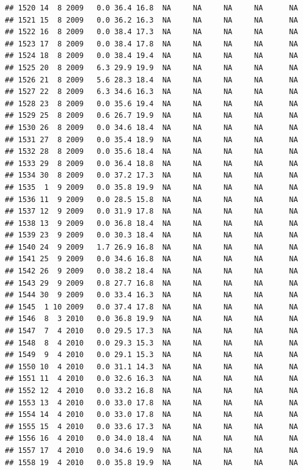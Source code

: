 \documentclass[
]{book}
\begin{document}
\begin{verbatim}
## 1520 14  8 2009   0.0 36.4 16.8  NA     NA     NA     NA      NA
## 1521 15  8 2009   0.0 36.2 16.3  NA     NA     NA     NA      NA
## 1522 16  8 2009   0.0 38.4 17.3  NA     NA     NA     NA      NA
## 1523 17  8 2009   0.0 38.4 17.8  NA     NA     NA     NA      NA
## 1524 18  8 2009   0.0 38.4 19.4  NA     NA     NA     NA      NA
## 1525 20  8 2009   6.3 29.9 19.9  NA     NA     NA     NA      NA
## 1526 21  8 2009   5.6 28.3 18.4  NA     NA     NA     NA      NA
## 1527 22  8 2009   6.3 34.6 16.3  NA     NA     NA     NA      NA
## 1528 23  8 2009   0.0 35.6 19.4  NA     NA     NA     NA      NA
## 1529 25  8 2009   0.6 26.7 19.9  NA     NA     NA     NA      NA
## 1530 26  8 2009   0.0 34.6 18.4  NA     NA     NA     NA      NA
## 1531 27  8 2009   0.0 35.4 18.9  NA     NA     NA     NA      NA
## 1532 28  8 2009   0.0 35.6 18.4  NA     NA     NA     NA      NA
## 1533 29  8 2009   0.0 36.4 18.8  NA     NA     NA     NA      NA
## 1534 30  8 2009   0.0 37.2 17.3  NA     NA     NA     NA      NA
## 1535  1  9 2009   0.0 35.8 19.9  NA     NA     NA     NA      NA
## 1536 11  9 2009   0.0 28.5 15.8  NA     NA     NA     NA      NA
## 1537 12  9 2009   0.0 31.9 17.8  NA     NA     NA     NA      NA
## 1538 13  9 2009   0.0 36.8 18.4  NA     NA     NA     NA      NA
## 1539 23  9 2009   0.0 30.3 18.4  NA     NA     NA     NA      NA
## 1540 24  9 2009   1.7 26.9 16.8  NA     NA     NA     NA      NA
## 1541 25  9 2009   0.0 34.6 16.8  NA     NA     NA     NA      NA
## 1542 26  9 2009   0.0 38.2 18.4  NA     NA     NA     NA      NA
## 1543 29  9 2009   0.8 27.7 16.8  NA     NA     NA     NA      NA
## 1544 30  9 2009   0.0 33.4 16.3  NA     NA     NA     NA      NA
## 1545  1 10 2009   0.0 37.4 17.8  NA     NA     NA     NA      NA
## 1546  8  3 2010   0.0 36.8 19.9  NA     NA     NA     NA      NA
## 1547  7  4 2010   0.0 29.5 17.3  NA     NA     NA     NA      NA
## 1548  8  4 2010   0.0 29.3 15.3  NA     NA     NA     NA      NA
## 1549  9  4 2010   0.0 29.1 15.3  NA     NA     NA     NA      NA
## 1550 10  4 2010   0.0 31.1 14.3  NA     NA     NA     NA      NA
## 1551 11  4 2010   0.0 32.6 16.3  NA     NA     NA     NA      NA
## 1552 12  4 2010   0.0 33.2 16.8  NA     NA     NA     NA      NA
## 1553 13  4 2010   0.0 33.0 17.8  NA     NA     NA     NA      NA
## 1554 14  4 2010   0.0 33.0 17.8  NA     NA     NA     NA      NA
## 1555 15  4 2010   0.0 33.6 17.3  NA     NA     NA     NA      NA
## 1556 16  4 2010   0.0 34.0 18.4  NA     NA     NA     NA      NA
## 1557 17  4 2010   0.0 34.6 19.9  NA     NA     NA     NA      NA
## 1558 19  4 2010   0.0 35.8 19.9  NA     NA     NA     NA      NA

\end{verbatim}
\end{document}

